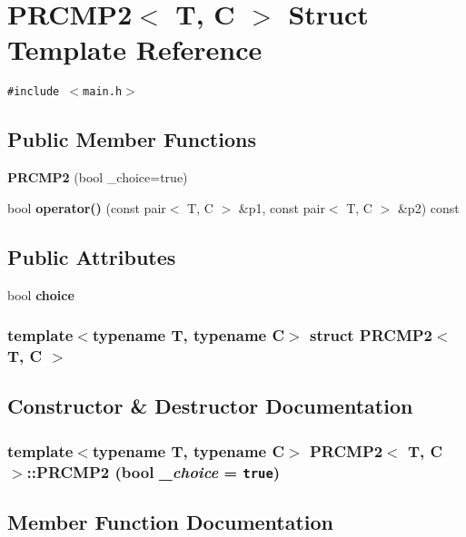\section{PRCMP2$<$ T, C $>$ Struct Template Reference}
\label{structPRCMP2}
{\tt \#include $<$main.h$>$}

\subsection*{Public Member Functions}
\begin{CompactItemize}
\item 
{\bf PRCMP2} (bool \_\-choice=true)
\item 
bool {\bf operator()} (const pair$<$ T, C $>$ \&p1, const pair$<$ T, C $>$ \&p2) const
\end{CompactItemize}
\subsection*{Public Attributes}
\begin{CompactItemize}
\item 
bool {\bf choice}
\end{CompactItemize}
\subsubsection*{template$<$typename T, typename C$>$ struct PRCMP2$<$ T, C $>$}



\subsection{Constructor \& Destructor Documentation}
\subsubsection{\setlength{\rightskip}{0pt plus 5cm}template$<$typename T, typename C$>$ {\bf PRCMP2}$<$ T, C $>$::{\bf PRCMP2} (bool {\em \_\-choice} = {\tt true})\hspace{0.3cm}{\tt  [inline]}}\label{structPRCMP2_d2b672f6725d892ee624caf735d7527b}




\subsection{Member Function Documentation}
